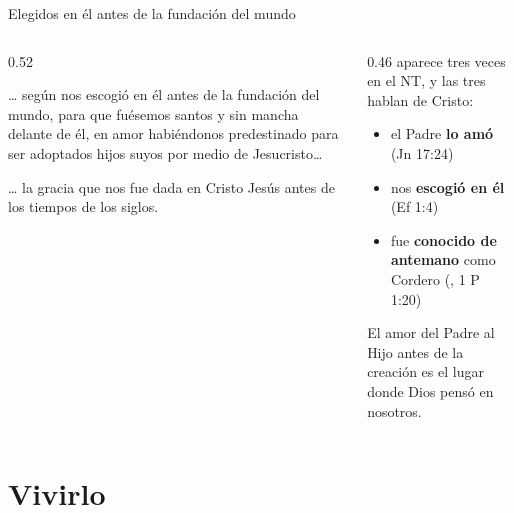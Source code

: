 \begin{frame}{Elegidos en él antes de la fundación del mundo}
\begin{columns}[t,onlytextwidth]
\begin{column}{0.52\textwidth}
\begin{cita}\ldots{} según nos escogió en él antes de la fundación del mundo, para que fuésemos santos y sin mancha delante de él, en amor habiéndonos predestinado para ser adoptados hijos suyos por medio de Jesucristo\ldots{}\end{cita}
\begin{cita}\ldots{} la gracia que nos fue dada en Cristo Jesús antes de los tiempos de los siglos.\end{cita}
\end{column}
\begin{column}{0.46\textwidth}\scriptsize
{} aparece tres veces en el NT, y las tres hablan de Cristo:
\begin{itemize}
\item el Padre \textbf{lo amó} (Jn 17:24)
\item nos \textbf{escogió en él} (Ef 1:4)
\item fue \textbf{conocido de antemano} como Cordero (, 1 P 1:20)
\end{itemize}
\small El amor del Padre al Hijo antes de la creación es el lugar donde Dios pensó en nosotros.\par\smallskip
{}
\end{column}
\end{columns}
\end{frame}

\section{Vivirlo}

